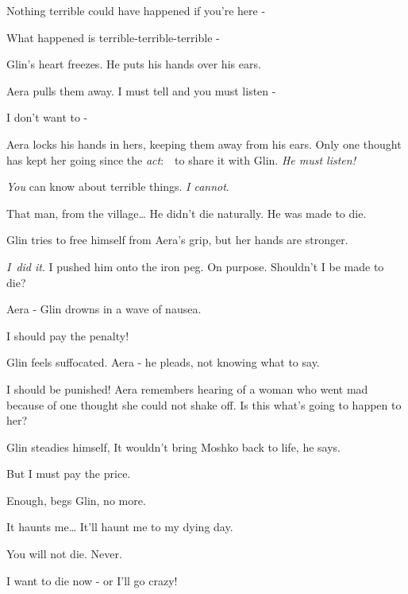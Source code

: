 \documentclass[twoside,11pt]{book}
\begin{document}
{\textquotedbl}Nothing terrible could have happened if you're here -{\textquotedbl} 

{\textquotedbl}What happened is terrible-terrible-terrible -{\textquotedbl} 

Glin's heart freezes. He puts his hands over his ears. 

Aera pulls them away. {\textquotedbl}I must tell and you must listen -{\textquotedbl} 

{\textquotedbl}I don't want to -{\textquotedbl} 

Aera locks his hands in hers, keeping them away from his ears. Only one thought has kept her going since the
\textit{act}:\ \ to share it with Glin. \textit{He must listen! }

{\textquotedbl}\textit{You} can know about terrible things. \textit{I cannot}.{\textquotedbl} \ 

{\textquotedbl}That man, from the village{\dots} He didn't die naturally. He was made to die.{\textquotedbl} 

Glin tries to free himself from Aera's grip, but her hands are stronger. 

{\textquotedbl}\textit{I}\ \textit{did it}. I pushed him onto the iron peg. On purpose. Shouldn't I be made to
die?{\textquotedbl} 

{\textquotedbl}Aera -{\textquotedbl} Glin drowns in a wave of nausea. 

{\textquotedbl}I should pay the penalty!{\textquotedbl}

Glin feels suffocated. {\textquotedbl}Aera -{\textquotedbl} he pleads, not knowing what to say. 

{\textquotedbl}I should be punished!{\textquotedbl} Aera remembers hearing of a woman who went mad because of one
thought she could not shake off. Is this what's going to happen to her? 

Glin steadies himself, {\textquotedbl}It wouldn't bring Moshko back to life,{\textquotedbl} he says. 

{\textquotedbl}But I must pay the price.{\textquotedbl} 

{\textquotedbl}Enough,{\textquotedbl} begs Glin, {\textquotedbl}no more.{\textquotedbl} 

{\textquotedbl}It haunts me{\dots} It'll haunt me to my dying day.{\textquotedbl} 

{\textquotedbl}You will not die. Never.{\textquotedbl} 

{\textquotedbl}I want to die now - or I'll go crazy!{\textquotedbl} 
\end{document}
